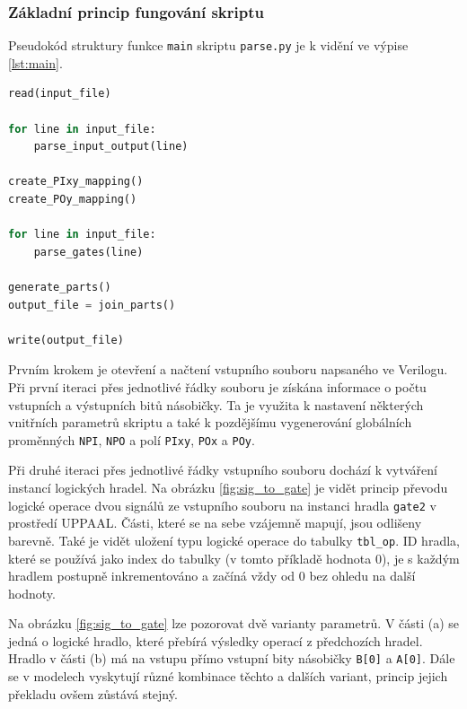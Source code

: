 \subsubsection{Základní princip fungování skriptu}
Pseudokód struktury funkce \texttt{main} skriptu \texttt{parse.py} je k vidění ve výpise \ref{lst:main}.
\begin{lstlisting}[language={Python}, caption={Pseudokód hlavní části skriptu parse.py}, label={lst:main}]
read(input_file)

for line in input_file:
    parse_input_output(line)

create_PIxy_mapping()
create_POy_mapping()

for line in input_file:
    parse_gates(line)

generate_parts()
output_file = join_parts()

write(output_file)
\end{lstlisting}

Prvním krokem je otevření a načtení vstupního souboru napsaného ve Verilogu. Při první iteraci přes jednotlivé řádky souboru je získána informace o počtu vstupních a výstupních bitů násobičky. Ta je využita k nastavení některých vnitřních parametrů skriptu a také k pozdějšímu vygenerování globálních proměnných \texttt{NPI}, \texttt{NPO} a polí \texttt{PIxy}, \texttt{POx} a \texttt{POy}.

Při druhé iteraci přes jednotlivé řádky vstupního souboru dochází k vytváření instancí logických hradel. Na obrázku \ref{fig:sig_to_gate} je vidět princip převodu logické operace dvou signálů ze vstupního souboru na instanci hradla \texttt{gate2} v prostředí UPPAAL. Části, které se na sebe vzájemně mapují, jsou odlišeny barevně. Také je vidět uložení typu logické operace do tabulky \texttt{tbl\_op}. ID hradla, které se používá jako index do tabulky (v tomto příkladě hodnota 0), je s každým hradlem postupně inkrementováno a začíná vždy od 0 bez ohledu na další hodnoty.

Na obrázku \ref{fig:sig_to_gate} lze pozorovat dvě varianty parametrů. V části (a) se jedná o logické hradlo, které přebírá výsledky operací z předchozích hradel. Hradlo v části (b) má na vstupu přímo vstupní bity násobičky \texttt{B[0]} a \texttt{A[0]}. Dále se v modelech vyskytují různé kombinace těchto a dalších variant, princip jejich překladu ovšem zůstává stejný.

